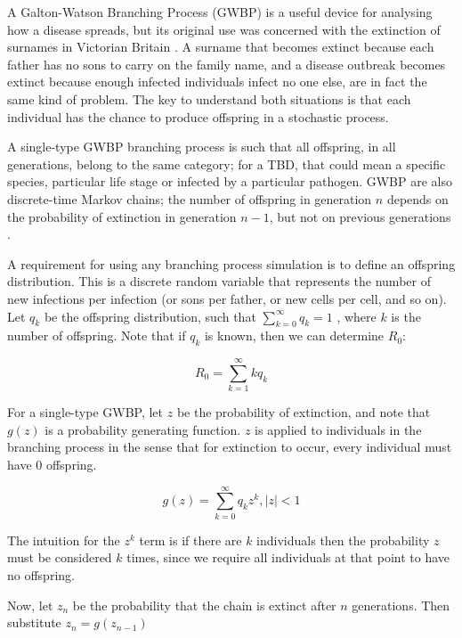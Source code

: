 \documentclass{article}
\begin{document}
A Galton-Watson Branching Process (GWBP) is a useful device for analysing how a disease spreads, but its original use was concerned with the extinction of surnames in Victorian Britain \cite{Athreya1972}. A surname that becomes extinct because each father has no sons to carry on the family name, and a disease outbreak becomes extinct because enough infected individuals infect no one else, are in fact the same kind of problem. The key to understand both situations is that each individual has the chance to produce offspring in a stochastic process.

A single-type GWBP branching process is such that all offspring, in all generations, belong to the same category; for a TBD, that could mean a specific species, particular life stage or infected by a particular pathogen. GWBP are also discrete-time Markov chains; the number of offspring in generation $ n $ depends on the probability of extinction in generation $ n - 1 $, but not on previous generations \cite{Allen2019}.

A requirement for using any branching process simulation is to define an offspring distribution. This is a discrete random variable that represents the number of new infections per infection (or sons per father, or new cells per cell, and so on). Let $ q_k $ be the offspring distribution, such that $ \sum_{k=0}^\infty q_k = 1 $ \cite{Diekman2000}, where $ k $ is the number of offspring.  Note that if $ q_k $ is known, then we can determine $ R_0 $:

\begin{equation}\label{offspringR0}
	R_0 = \sum_{k=1}^\infty k q_k
\end{equation}

For a single-type GWBP, let $ z $ be the probability of extinction, and note that $ g(z) $ is a probability generating function. $ z $ is applied to individuals in the branching process in the sense that for extinction to occur, every individual must have $ 0 $ offspring.

\begin{equation}\label{BranchingProcessPGF}
    g(z) = \sum_{k=0}^\infty q_k z^k, |z| < 1
\end{equation}

The intuition for the $ z^k $ term is if there are $ k $ individuals then the probability $ z $ must be considered $ k $ times, since we require all individuals at that point to have no offspring.

Now, let $ z_n $ be the probability that the chain is extinct after $ n $ generations. Then substitute $ z_n = g(z_{n-1})$
\end{document}
